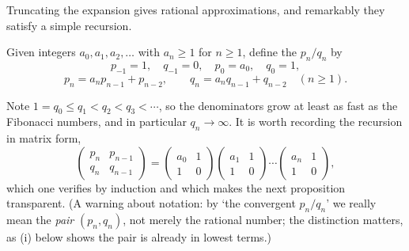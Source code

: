 \documentclass[a4paper]{scrartcl}
\begin{document}
Truncating the expansion gives rational approximations, and remarkably they satisfy a simple recursion.

\begin{definition}
	Given integers $a_0, a_1, a_2, \dots$ with $a_n \geq 1$ for $n \geq 1$, define the  $p_n/q_n$ by
	$$
	p_{-1} = 1, \quad q_{-1} = 0, \quad p_0 = a_0, \quad q_0 = 1,
	$$
	$$
	p_n = a_np_{n-1} + p_{n-2}, \qquad q_n = a_nq_{n-1} + q_{n-2} \quad (n \geq 1).
	$$
\end{definition}

Note $1 = q_0 \leq q_1 < q_2 < q_3 < \cdots$, so the denominators grow at least as fast as the Fibonacci numbers, and in particular $q_n \to \infty$. It is worth recording the recursion in matrix form,
$$
\begin{pmatrix} p_n & p_{n-1} \\ q_n & q_{n-1}\end{pmatrix} = \begin{pmatrix} a_0 & 1 \\ 1 & 0\end{pmatrix}\begin{pmatrix} a_1 & 1 \\ 1 & 0\end{pmatrix}\cdots\begin{pmatrix}a_n & 1 \\ 1 & 0\end{pmatrix},
$$
which one verifies by induction and which makes the next proposition transparent. (A warning about notation: by `the convergent $p_n/q_n$' we really mean the \emph{pair} $(p_n, q_n)$, not merely the rational number; the distinction matters, as (i) below shows the pair is already in lowest terms.)
\end{document}
